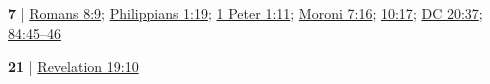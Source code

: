 \begin{compactdesc}
		\item[spirit of Christ] \textbf{7} | \hyperref[ROMANS-8-9]{Romans 8:9}; \hyperref[PHILIPPIANS-1-19]{Philippians 1:19}; \hyperref[1PETER-1-11]{1 Peter 1:11}; \hyperref[MORONI-7-16]{Moroni 7:16}; \hyperref[MORONI-10-17]{10:17}; \hyperref[DC20-37]{DC 20:37}; \hyperref[DC84-45]{84:45--46}
			
		\item[spirit of prophecy] \textbf{21} | \hyperref[REVELATIONNT-19-10]{Revelation 19:10}
			\begin{compactdesc}
				\item[Bible anchor verses] \phantom{.}
					\begin{compactdesc}
						\item[Revelation 19:10] 
					\end{compactdesc}
			\end{compactdesc}
			

\end{compactdesc}
